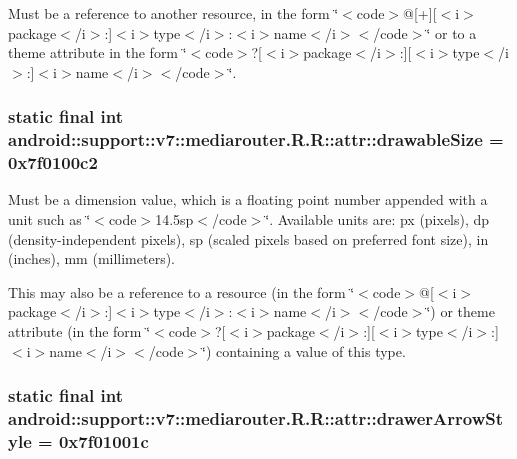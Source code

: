 Must be a reference to another resource, in the form \char`\"{}$<$code$>$@\mbox{[}+\mbox{]}\mbox{[}$<$i$>$package$<$/i$>$:\mbox{]}$<$i$>$type$<$/i$>$:$<$i$>$name$<$/i$>$$<$/code$>$\char`\"{} or to a theme attribute in the form \char`\"{}$<$code$>$?\mbox{[}$<$i$>$package$<$/i$>$:\mbox{]}\mbox{[}$<$i$>$type$<$/i$>$:\mbox{]}$<$i$>$name$<$/i$>$$<$/code$>$\char`\"{}. \hypertarget{classandroid_1_1support_1_1v7_1_1mediarouter_1_1_r_1_1attr_e067b113af911e193284ccdde846ca78}{
\subsubsection[{drawableSize}]{\setlength{\rightskip}{0pt plus 5cm}static final int android::support::v7::mediarouter.R.R::attr::drawableSize = 0x7f0100c2}}
\label{classandroid_1_1support_1_1v7_1_1mediarouter_1_1_r_1_1attr_e067b113af911e193284ccdde846ca78}


Must be a dimension value, which is a floating point number appended with a unit such as \char`\"{}$<$code$>$14.5sp$<$/code$>$\char`\"{}. Available units are: px (pixels), dp (density-independent pixels), sp (scaled pixels based on preferred font size), in (inches), mm (millimeters). 

This may also be a reference to a resource (in the form \char`\"{}$<$code$>$@\mbox{[}$<$i$>$package$<$/i$>$:\mbox{]}$<$i$>$type$<$/i$>$:$<$i$>$name$<$/i$>$$<$/code$>$\char`\"{}) or theme attribute (in the form \char`\"{}$<$code$>$?\mbox{[}$<$i$>$package$<$/i$>$:\mbox{]}\mbox{[}$<$i$>$type$<$/i$>$:\mbox{]}$<$i$>$name$<$/i$>$$<$/code$>$\char`\"{}) containing a value of this type. \hypertarget{classandroid_1_1support_1_1v7_1_1mediarouter_1_1_r_1_1attr_06be1d348aba0409f1f983ec164e2010}{
\subsubsection[{drawerArrowStyle}]{\setlength{\rightskip}{0pt plus 5cm}static final int android::support::v7::mediarouter.R.R::attr::drawerArrowStyle = 0x7f01001c}}
\label{classandroid_1_1support_1_1v7_1_1mediarouter_1_1_r_1_1attr_06be1d348aba0409f1f983ec164e2010}


